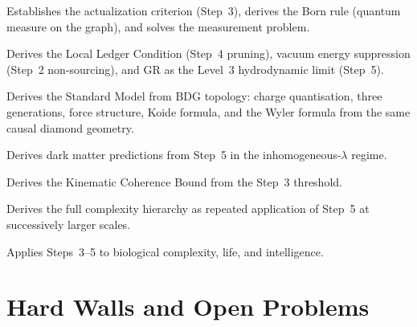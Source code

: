 \documentclass[11pt,a4paper]{article}
\theoremstyle{plain}
\theoremstyle{definition}
\theoremstyle{remark}
\begin{document}
\begin{description}[leftmargin=1.5em]
  \item[\textbf{RAQM}~\citep{Sandeman2026a}] Establishes the actualization
  criterion (Step~3), derives the Born rule (quantum measure on the graph),
  and solves the measurement problem.
  \item[\textbf{RAGC}~\citep{Sandeman2026b}] Derives the Local Ledger
  Condition (Step~4 pruning), vacuum energy suppression (Step~2 non-sourcing),
  and GR as the Level~3 hydrodynamic limit (Step~5).
  \item[\textbf{RASM}~\citep{Sandeman2026RASM}] Derives the Standard Model
  from BDG topology: charge quantisation, three generations, force structure,
  Koide formula, and the Wyler formula from the same causal diamond geometry.
  \item[\textbf{RADM}~\citep{Sandeman2026RADM}] Derives dark matter predictions
  from Step~5 in the inhomogeneous-$\lambda$ regime.
  \item[\textbf{RAQI}~\citep{Sandeman2026d}] Derives the Kinematic Coherence
  Bound from the Step~3 threshold.
  \item[\textbf{RAHC}~\citep{Sandeman2026RAHC}] Derives the full complexity
  hierarchy as repeated application of Step~5 at successively larger scales.
  \item[\textbf{RACI}~\citep{Sandeman2026c}] Applies Steps~3--5 to biological
  complexity, life, and intelligence.
\end{description}

\section{Hard Walls and Open Problems}
\label{sec:hardwalls}
\end{document}
